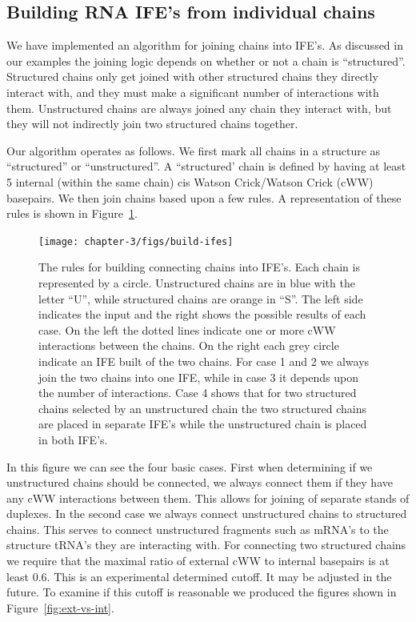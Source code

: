 \subsection{Building RNA IFE's from individual chains}

We have implemented an algorithm for joining chains into IFE's. As discussed in
our examples the joining logic depends on whether or not a chain is
``structured''. Structured chains only get joined with other structured chains
they directly interact with, and they must make a significant number of
interactions with them. Unstructured chains are always joined any chain they
interact with, but they will not indirectly join two structured chains together.

Our algorithm operates as follows. We first mark all chains in a structure as
``structured'' or ``unstructured''. A ``structured' chain is defined by having at
least 5 internal (within the same chain) cis Watson Crick/Watson Crick (cWW)
basepairs. We then join chains based upon a few rules. A representation of these
rules is shown in Figure~\ref{fig:build-ife}.

\begin{figure}
  \texttt{[image: chapter-3/figs/build-ifes]}
  \caption{The rules for building connecting chains into IFE's. Each chain is
    represented by a circle. Unstructured chains are in blue with the letter
    ``U'', while structured chains are orange in ``S''. The left side indicates the
    input and the right shows the possible results of each case. On the left the
    dotted lines indicate one or more cWW interactions between the chains. On
    the right each grey circle indicate an IFE built of the two chains. For case
    1 and 2 we always join the two chains into one IFE, while in case 3 it
    depends upon the number of interactions. Case 4 shows that for two
    structured chains selected by an unstructured chain the two structured
    chains are placed in separate IFE’s while the unstructured chain is placed
  in both IFE's.}
  \label{fig:build-ife}
\end{figure}

In this figure we can see the four basic cases. First when determining if we
unstructured chains should be connected, we always connect them if they have any
cWW interactions between them. This allows for joining of separate stands of
duplexes. In the second case we always connect unstructured chains to structured
chains. This serves to connect unstructured fragments such as mRNA’s to the
structure tRNA’s they are interacting with. For connecting two structured chains
we require that the maximal ratio of external cWW to internal basepairs is at
least 0.6. This is an experimental determined cutoff. It may be adjusted in the
future. To examine if this cutoff is reasonable we produced the figures shown in
Figure~\ref{fig:ext-vs-int}.

